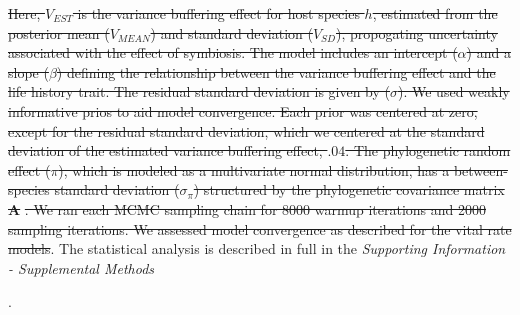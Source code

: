 \documentclass[lineno,sn-nature]{sn-jnl}%
\providecommand{\DIFadd}[1]{{\protect\color{blue}#1}} %
\providecommand{\DIFdel}[1]{{\protect\color{red}\protect\scriptsize\sout{#1}}}
\providecommand{\DIFadd}[1]{{\protect\color{blue}\uwave{#1}}} %
\providecommand{\DIFdel}[1]{{\protect\color{red}\sout{#1}}}                      %
\providecommand{\DIFaddbegin}{} %
\providecommand{\DIFaddend}{} %
\providecommand{\DIFdelend}{} %
\newcommand{\DIFaddincludegraphics}[2][]{{\color{blue}\fbox{\DIFOincludegraphics[#1]{#2}}}} %
\DeclareRobustCommand{\DIFaddbegin}{\DIFOaddbegin \let\includegraphics\DIFaddincludegraphics} %
\DeclareRobustCommand{\DIFaddend}{\DIFOaddend \let\includegraphics\DIFOincludegraphics} %
\DeclareRobustCommand{\DIFdelend}{\DIFOaddend \let\includegraphics\DIFOincludegraphics} %
\begin{document}

\DIFdel{Here, $V_{EST}$ is the variance buffering effect for host species $h$, estimated from the posterior mean ($V_{MEAN}$) and standard deviation ($V_{SD}$), propogating uncertainty associated with the effect of symbiosis.
	The model includes an intercept ($\alpha$) and a slope ($\beta$) defining the relationship between the variance buffering effect and the life history trait. 
	The residual standard deviation is given by ($\sigma$). 
	We used weakly informative prios to aid model convergence.
	Each prior was centered at zero, except for the residual standard deviation, which we centered at the standard deviation of the estimated variance buffering effect, $.04$.
	The phylogenetic random effect ($\pi$), which is modeled as a multivariate normal distribution, has a between-species standard deviation ($\sigma_{\pi}$) structured by the phylogenetic covariance matrix }\textbf{\DIFdel{A}}%
\DIFdel{.
	We ran each MCMC sampling chain for 8000 warmup iterations and 2000 sampling iterations. 
	We assessed model convergence as described for the vital rate models}\DIFdelend .
	\DIFaddbegin \DIFadd{The statistical analysis is described in full in the }\emph{\DIFadd{Supporting Information - Supplemental Methods}}\DIFadd{.

}\DIFaddend 

	
\end{document}
